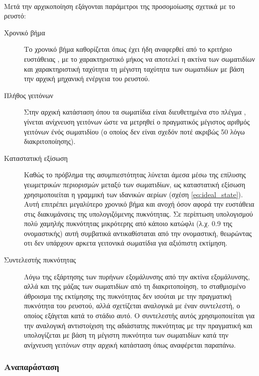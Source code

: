\paragraph{} Μετά την αρχικοποίηση εξάγονται παράμετροι της προσομοίωσης σχετικά με το
ρευστό:
\begin{description}
\item[Χρονικό βήμα] Το χρονικό βήμα καθορίζεται όπως έχει ήδη αναφερθεί από το κριτήριο
  ευστάθειας , με το χαρακτηριστικό μήκος να αποτελεί η ακτίνα των σωματιδίων και
  χαρακτηριστική ταχύτητα τη μέγιστη ταχύτητα των σωματιδίων με βάση την αρχική μηχανική
  ενέργεια του ρευστού.
\item[Πλήθος γειτόνων] Στην αρχική κατάσταση όπου τα σωματίδια είναι διευθετημένα στο
  πλέγμα , γίνεται ανίχνευση γειτόνων ώστε να μετρηθεί ο πραγματικός μέγιστος
  αριθμός γειτόνων ένός σωματιδίου (ο οποίος δεν είναι σχεδόν ποτέ ακριβώς 50 λόγω
  διακριτοποίησης).
\item[Καταστατική εξίσωση] Καθώς το πρόβλημα της ασυμπιεστότητας λύνεται άμεσα μέσω της
  επίλυσης γεωμετρικών περιορισμών μεταξύ των σωματιδίων, ως καταστατική εξίσωση
  χρησιμοποιείται η γραμμική των ιδανικών αερίων (σχέση \ref{eq:ideal_state}). Αυτή
  επιτρέπει μεγαλύτερο χρονικό βήμα και ανοχή όσον αφορά την ευστάθεια στις διακυμάνσεις
  της υπολογιζόμενης πυκνότητας. Σε περίπτωση υπολογισμού πολύ χαμηλής πυκνότητας
  μικρότερης από κάποιο κατώφλι (λ.χ. 0.9 της ονομαστικής) αυτή συμβατικά αντικαθίσταται
  από την ονομαστική, θεωρώντας οτι δεν υπάρχουν αρκετα γειτονικά σωματίδια για αξιόπιστη
  εκτίμηση.
\item[Συντελεστής πυκνότητας] Λόγω της εξάρτησης των πυρήνων εξομάλυνσης από την ακτίνα
  εξομάλυνσης, αλλά και της μάζας των σωματιδίων από τη διακριτοποίηση, το σταθμισμένο
  άθροισμα της εκτίμησης της πυκνότητας δεν ισούται με την πραγματική πυκνότητα του
  ρευστού, αλλά σχετίζεται αναλογικά με έναν συντελεστή, ο οποίος εξάγεται κατά το στάδιο
  αυτό. Ο συντελεστής αυτός χρησιμοποιείται για την αναλογική αντιστοίχιση της αδιάστατης
  πυκνότητας με την πραγματική και υπολογίζεται με βάση τη μέγιστη πυκνότητα των
  σωματιδίων κατά την ανίχνευση γειτόνων στην αρχική κατάσταση όπως αναφέρεται παραπάνω.
\end{description}

\subsubsection{Αναπαράσταση}

